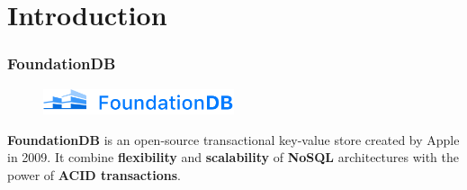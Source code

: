 
\section{Introduction} %


\begin{frame}
\frametitle{FoundationDB}

\begin{figure}
    \centering
    \includegraphics[width=0.5\textwidth]{img/1-Introduction/foundationBD-logo.png}
    
\end{figure}

\textbf{FoundationDB} is an open-source transactional key-value store created by Apple in 2009. It combine \textbf{flexibility} and \textbf{scalability} of \textbf{NoSQL} architectures with the power of \textbf{ACID transactions}.
	
\end{frame}


